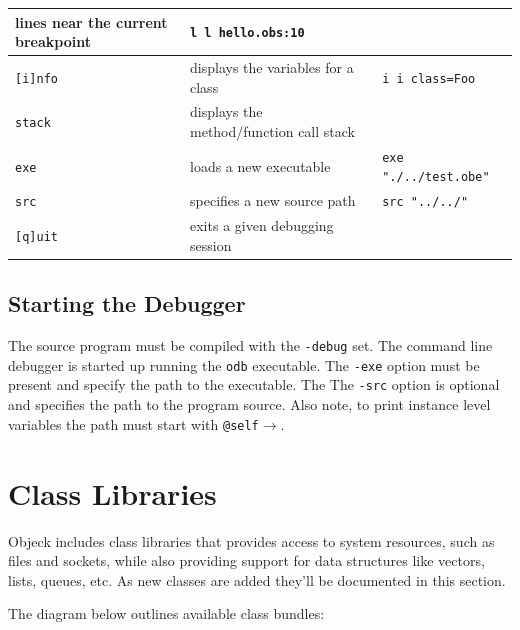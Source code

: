 \documentclass[11pt]{article}
\begin{document}
\begin{center}
\begin{tabular}{| l |p{4 cm} |p{4 cm} |}
    lines near the current breakpoint & \texttt{l \newline l hello.obs:10} \\ \hline
    \texttt{[i]nfo} &  displays the variables for a class & \texttt{i
      \newline i class=Foo} \\ \hline
    \texttt{stack} &  displays the method/function call stack &  \\ \hline
    \texttt{exe} &  loads a new executable & \texttt{exe "./../test.obe"} \\ \hline
    \texttt{src} &  specifies a new source path & \texttt{src "../../"} \\ \hline
    \texttt{[q]uit} &  exits a given debugging session &  \\ \hline
  \end{tabular}
\end{center}

\subsection{Starting the Debugger}
The source program must be compiled with the \texttt{-debug} set. The
command line debugger is started up running the \texttt{odb}
executable. The \texttt{-exe} option must be present and specify the
path to the executable.  The The \texttt{-src} option is optional and
specifies the path to the program source.  Also note, to print
instance level variables the path must start with
\texttt{@self$\rightarrow$}.

\section{Class Libraries}
Objeck includes class libraries that provides access to system
resources, such as files and sockets, while also providing support for
data structures like vectors, lists, queues, etc.  As new classes are
added they'll be documented in this section.

The diagram below outlines available class bundles:
\end{document}
